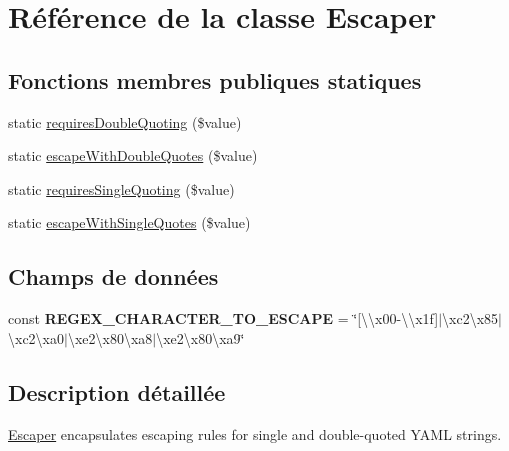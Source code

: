 \hypertarget{class_symfony_1_1_component_1_1_yaml_1_1_escaper}{}\section{Référence de la classe Escaper}
\label{class_symfony_1_1_component_1_1_yaml_1_1_escaper}
\subsection*{Fonctions membres publiques statiques}
\begin{DoxyCompactItemize}
\item 
static \hyperlink{class_symfony_1_1_component_1_1_yaml_1_1_escaper_aba554793905ac2af7e34700abd23fccb}{requires\+Double\+Quoting} (\$value)
\item 
static \hyperlink{class_symfony_1_1_component_1_1_yaml_1_1_escaper_a142ef6c0a7582892e8f6f2d4b8110671}{escape\+With\+Double\+Quotes} (\$value)
\item 
static \hyperlink{class_symfony_1_1_component_1_1_yaml_1_1_escaper_a1e40fe8fddcaed11310203458324173a}{requires\+Single\+Quoting} (\$value)
\item 
static \hyperlink{class_symfony_1_1_component_1_1_yaml_1_1_escaper_a7fa4acbe5a034972c7083bb46c777030}{escape\+With\+Single\+Quotes} (\$value)
\end{DoxyCompactItemize}
\subsection*{Champs de données}
\begin{DoxyCompactItemize}
\item 
const {\bfseries R\+E\+G\+E\+X\+\_\+\+C\+H\+A\+R\+A\+C\+T\+E\+R\+\_\+\+T\+O\+\_\+\+E\+S\+C\+A\+PE} = \char`\"{}\mbox{[}\textbackslash{}\textbackslash{}x00-\/\textbackslash{}\textbackslash{}x1f\mbox{]}$\vert$\textbackslash{}xc2\textbackslash{}x85$\vert$\textbackslash{}xc2\textbackslash{}xa0$\vert$\textbackslash{}xe2\textbackslash{}x80\textbackslash{}xa8$\vert$\textbackslash{}xe2\textbackslash{}x80\textbackslash{}xa9\char`\"{}\hypertarget{class_symfony_1_1_component_1_1_yaml_1_1_escaper_a35ce88401a0b249e400659276c997046}{}\label{class_symfony_1_1_component_1_1_yaml_1_1_escaper_a35ce88401a0b249e400659276c997046}

\end{DoxyCompactItemize}


\subsection{Description détaillée}
\hyperlink{class_symfony_1_1_component_1_1_yaml_1_1_escaper}{Escaper} encapsulates escaping rules for single and double-\/quoted Y\+A\+ML strings.

